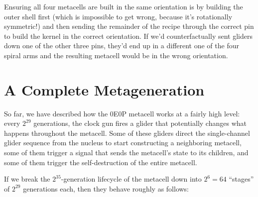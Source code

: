Ensuring all four metacells are built in the same orientation is by building the outer shell first (which is impossible to get wrong, because it's rotationally symmetric!) and then sending the remainder of the recipe through the correct pin to build the kernel in the correct orientation. If we'd counterfactually sent gliders down one of the other three pins, they'd end up in a different one of the four spiral arms and the resulting metacell would be in the wrong orientation.





\section{A Complete Metageneration}\label{sec:0e0p_timeline}

So far, we have described how the 0E0P metacell works at a fairly high level: every $2^{29}$ generations, the clock gun fires a glider that potentially changes what happens throughout the metacell. Some of these gliders direct the single-channel glider sequence from the nucleus to start constructing a neighboring metacell, some of them trigger a signal that sends the metacell's state to its children, and some of them trigger the self-destruction of the entire metacell.

If we break the $2^{35}$-generation lifecycle of the metacell down into $2^6 = 64$ ``stages'' of $2^{29}$ generations each, then they behave roughly as follows:\smallskip

